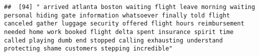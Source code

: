 \documentclass[
]{article}
\begin{document}
\begin{verbatim}
##  [94] " arrived atlanta boston waiting flight leave morning waiting personal hiding gate information whatsoever finally told flight canceled gather luggage security offered flight hours reimbursement needed home work booked flight delta spent insurance spirit time called playing dumb end stopped calling exhausting understand protecting shame customers stepping incredible"                                                                                                                                                                                                                                                                                                                                                                                                                                                                                                                                                                                                                                                                                                                                                                                                                                                                                                                                                                                                                                                                                                                                                                                                                                                                                                                                                                                                                

\end{verbatim}
\end{document}
